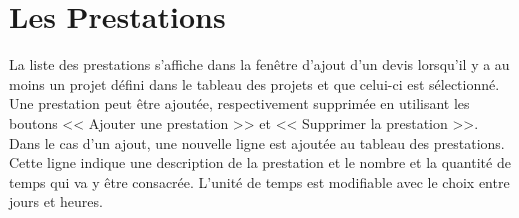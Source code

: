 \section{Les Prestations}
\label{ch:Prestations}
La liste des prestations s'affiche dans la fenêtre d'ajout d'un devis lorsqu'il y a au moins un projet défini dans le tableau des projets et que celui-ci est sélectionné. Une prestation peut être ajoutée, respectivement supprimée en utilisant les boutons << Ajouter une prestation >> et << Supprimer la prestation >>. Dans le cas d'un ajout, une nouvelle ligne est ajoutée au tableau des prestations. Cette ligne indique une description de la prestation et le nombre et la quantité de temps qui va y être consacrée. L'unité de temps est modifiable avec le choix entre jours et heures.